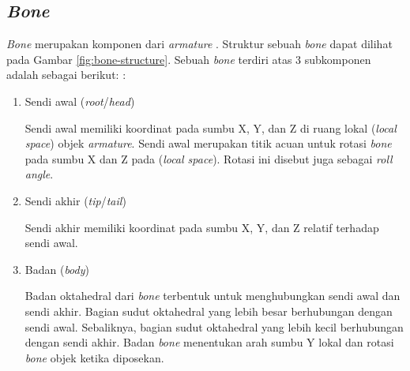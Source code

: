 \subsection{\textit{Bone}}
\textit{Bone} merupakan komponen dari \textit{armature}
\parencite{blender-bones-introduction}. Struktur sebuah \textit{bone} dapat
dilihat pada Gambar \ref{fig:bone-structure}. Sebuah \textit{bone} terdiri atas
3 subkomponen adalah sebagai berikut:
\parencite{blender-armature-structure,blender-glossary}:
\begin{enumerate}
    \item Sendi awal (\textit{root}/\textit{head})

    Sendi awal memiliki koordinat pada sumbu X, Y, dan Z di ruang lokal
    (\textit{local space}) objek \textit{armature}. Sendi awal merupakan titik
    acuan untuk rotasi \textit{bone} pada sumbu X dan Z pada (\textit{local
    space}). Rotasi ini disebut juga sebagai \textit{roll angle}.

    \item Sendi akhir (\textit{tip}/\textit{tail})

    Sendi akhir memiliki koordinat pada sumbu X, Y, dan Z relatif terhadap sendi
    awal.

    \item Badan (\textit{body})

    Badan oktahedral dari \textit{bone} terbentuk untuk menghubungkan sendi awal
    dan sendi akhir. Bagian sudut oktahedral yang lebih besar berhubungan
    dengan sendi awal. Sebaliknya, bagian sudut oktahedral yang lebih kecil
    berhubungan dengan sendi akhir. Badan \textit{bone} menentukan arah sumbu Y
    lokal dan rotasi \textit{bone} objek ketika diposekan.

\end{enumerate}

